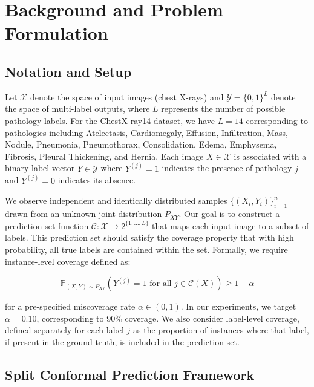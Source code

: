 \section{Background and Problem Formulation}
\label{sec:background-and-problem-formulation}

\subsection{Notation and Setup}
\label{subsec:notation-and-setup}

Let $\mathcal{X}$ denote the space of input images (chest X-rays) and $\mathcal{Y} = \{0,1\}^L$ denote the space of multi-label outputs, where $L$ represents the number of possible pathology labels.
For the ChestX-ray14 dataset, we have $L = 14$ corresponding to pathologies including Atelectasis, Cardiomegaly, Effusion, Infiltration, Mass, Nodule, Pneumonia, Pneumothorax, Consolidation, Edema, Emphysema, Fibrosis, Pleural Thickening, and Hernia.
Each image $X \in \mathcal{X}$ is associated with a binary label vector $Y \in \mathcal{Y}$ where $Y^{(j)} = 1$ indicates the presence of pathology $j$ and $Y^{(j)} = 0$ indicates its absence.

We observe independent and identically distributed samples $\{(X_i, Y_i)\}_{i=1}^n$ drawn from an unknown joint distribution $P_{XY}$.
Our goal is to construct a prediction set function $\mathcal{C}: \mathcal{X} \to 2^{\{1,\ldots,L\}}$ that maps each input image to a subset of labels.
This prediction set should satisfy the coverage property that with high probability, all true labels are contained within the set.
Formally, we require instance-level coverage defined as:

\begin{equation}
\mathbb{P}_{(X,Y) \sim P_{XY}}\left(Y^{(j)} = 1 \text{ for all } j \in \mathcal{C}(X)\right) \geq 1 - \alpha\label{eq:equation}
\end{equation}

for a pre-specified miscoverage rate $\alpha \in (0,1)$.
In our experiments, we target $\alpha = 0.10$, corresponding to 90\% coverage.
We also consider label-level coverage, defined separately for each label $j$ as the proportion of instances where that label, if present in the ground truth, is included in the prediction set.

\subsection{Split Conformal Prediction Framework}
\label{subsec:split-conformal-prediction-framework}

